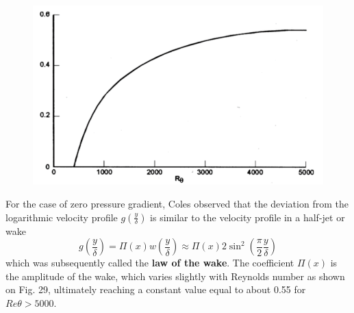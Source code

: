  		\begin{figure}
		\vspace{-5mm}
		\includegraphics[scale=0.4]{ch4/16}
		\label{fig:4.16}
		\end{figure} 
		For the case of zero pressure gradient, Coles observed that the deviation from the logarithmic velocity profile $g\left(\frac{y}{\delta} \right)$ is similar to the velocity profile in a half-jet
or wake
\begin{equation}
	g\left(\frac{y}{\delta} \right) = \Pi(x)w \left(\frac{y}{\delta} \right) \approx \Pi(x)2\sin ^2 \left(\frac{\pi}{2}\frac{y}{\delta} \right) 
\end{equation}
      which was subsequently called the \textbf{law of the wake}. The coefficient $\Pi (x)$ is the amplitude of the wake, which varies slightly with Reynolds number as shown on Fig. 29, ultimately reaching a constant value equal to about 0.55 for $Re\theta > 5000.$
      
     \newpage
